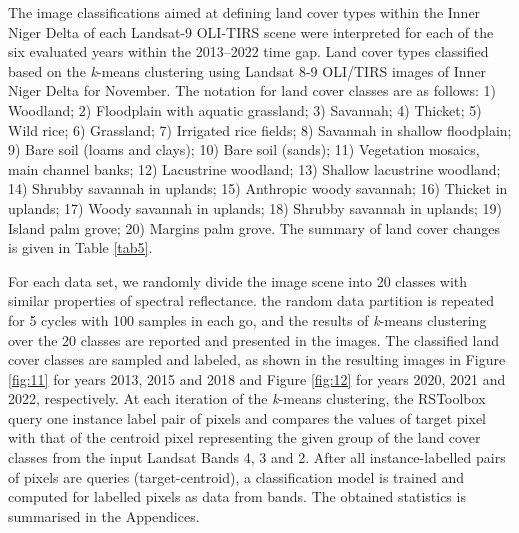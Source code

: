 \documentclass[remotesensing,article,submit,pdftex,moreauthors]{Definitions/mdpi}
\begin{document}
The image classifications aimed at defining land cover types within the Inner Niger Delta of each Landsat-9 OLI-TIRS scene were interpreted for each of the six evaluated years within the 2013--2022 time gap. Land cover types classified based on the \emph{k}-means clustering using Landsat 8-9 OLI/TIRS images of Inner Niger Delta for November. The notation for land cover classes are as follows: 1) Woodland; 2) Floodplain with aquatic grassland; 3) Savannah; 4) Thicket; 5) Wild rice; 6) Grassland; 7) Irrigated rice fields; 8) Savannah in shallow floodplain; 9) Bare soil (loams and clays); 10) Bare soil (sands); 11) Vegetation mosaics, main channel banks; 12) Lacustrine woodland; 13) Shallow lacustrine woodland; 14) Shrubby savannah in uplands; 15) Anthropic woody savannah; 16) Thicket in uplands; 17) Woody savannah in uplands; 18) Shrubby savannah in uplands; 19) Island palm grove; 20) Margins palm grove. The summary of land cover changes is given in Table \ref{tab5}.

For each data set, we randomly divide the image scene into 20 classes with similar properties of spectral reflectance. the random data partition is repeated for 5 cycles with 100 samples in each go, and the results of \emph{k}-means clustering over the 20 classes are reported and presented in the images. The classified land cover classes are sampled and labeled, as shown in the resulting images in Figure \ref{fig:11} for years 2013, 2015 and 2018 and Figure \ref{fig:12} for years 2020, 2021 and 2022, respectively. At each iteration of the \emph{k}-means clustering, the RSToolbox query one instance label pair of pixels and compares the values of target pixel with that of the centroid pixel representing the given group of the land cover classes from the input Landsat Bands 4, 3 and 2. After all instance-labelled pairs of pixels are queries (target-centroid), a classification model is trained and computed for labelled pixels as data from bands. The obtained statistics is summarised in the Appendices. 
\end{document}
